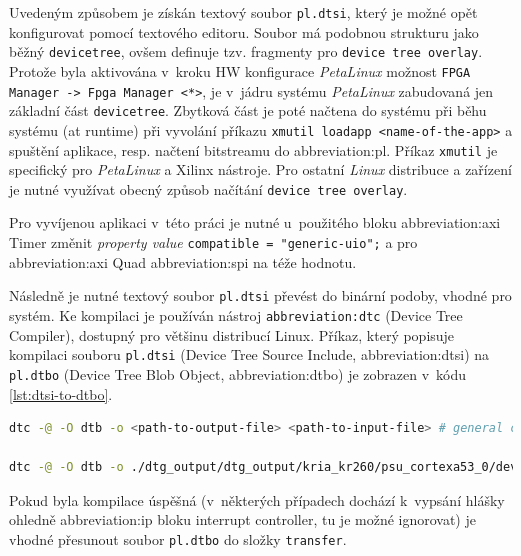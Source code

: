 \documentclass[a4paper, twoside, 11pt]{article}
\newcommand{\fbar}{\FloatBarrier}
\begin{document}
		Uvedeným způsobem je získán textový soubor \texttt{pl.dtsi}, který je možné opět konfigurovat pomocí textového editoru. Soubor má podobnou strukturu jako běžný \texttt{devicetree}, ovšem definuje tzv. fragmenty pro \texttt{device tree overlay}. Protože byla aktivována v~kroku HW konfigurace \textit{PetaLinux} možnost \texttt{FPGA Manager -> Fpga Manager <*>}, je v~jádru systému \textit{PetaLinux} zabudovaná jen základní část \texttt{devicetree}. Zbytková část je poté načtena do systému při běhu systému (at runtime) při vyvolání příkazu \texttt{xmutil loadapp <name-of-the-app>} a spuštění aplikace, resp. načtení bitstreamu do \gls{abbreviation:pl}. Příkaz \texttt{xmutil} je specifický pro \textit{PetaLinux} a Xilinx nástroje. Pro ostatní \textit{Linux} distribuce a zařízení je nutné využívat obecný způsob načítání \texttt{device tree overlay}.\par
		Pro vyvíjenou aplikaci v~této práci je nutné u~použitého bloku \gls{abbreviation:axi} Timer
		změnit \textit{property value} \texttt{compatible = "generic-uio";} a pro \gls{abbreviation:axi} Quad \gls{abbreviation:spi} na téže hodnotu.\par
		Následně je nutné textový soubor \texttt{pl.dtsi} převést do binární podoby, vhodné pro systém. Ke kompilaci je používán nástroj \texttt{\gls{abbreviation:dtc}} (Device Tree Compiler), dostupný pro většinu distribucí Linux. Příkaz, který popisuje kompilaci souboru \texttt{pl.dtsi} (Device Tree Source Include, \gls{abbreviation:dtsi}) na \texttt{pl.dtbo} (Device Tree Blob Object, \gls{abbreviation:dtbo}) je zobrazen v~kódu \ref{lst:dtsi-to-dtbo}.\par

		\begin{lstlisting}[language={sh}, caption={Kompilace textového souboru device tree overlay pl.dtsi na binární pl.dtbo}, label= {lst:dtsi-to-dtbo}, morekeywords={dtc}]
dtc -@ -O dtb -o <path-to-output-file> <path-to-input-file> # general command

dtc -@ -O dtb -o ./dtg_output/dtg_output/kria_kr260/psu_cortexa53_0/device_tree_domain/bsp/pl.dtbo ./dtg_output/dtg_output/kria_kr260/psu_cortexa53_0/device_tree_domain/bsp/pl.dtsi # command for project file structure
\end{lstlisting}
	Pokud byla kompilace úspěšná (v~některých případech dochází k~vypsání hlášky ohledně \gls{abbreviation:ip} bloku interrupt controller, tu je možné ignorovat) je vhodné přesunout soubor \texttt{pl.dtbo} do složky \texttt{transfer}.

	\fbar
\end{document}
